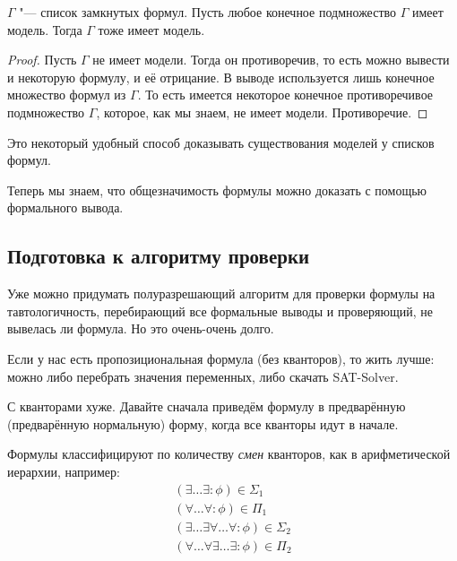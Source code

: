 \begin{theorem}
	$\Gamma$ "--- список замкнутых формул.
	Пусть любое конечное подмножество $\Gamma$ имеет модель.
	Тогда $\Gamma$ тоже имеет модель.
\end{theorem}
\begin{proof}
	Пусть $\Gamma$ не имеет модели.
	Тогда он противоречив, то есть можно вывести и некоторую формулу, и её отрицание.
	В выводе используется лишь конечное множество формул из $\Gamma$.
	То есть имеется некоторое конечное противоречивое подмножество $\Gamma$,
	которое, как мы знаем, не имеет модели.
	Противоречие.
\end{proof}
\begin{Rem}
	Это некоторый удобный способ доказывать существования моделей у списков формул.
\end{Rem}

\begin{Rem}
	Теперь мы знаем, что общезначимость формулы можно доказать с помощью формального вывода.
\end{Rem}

\subsection{Подготовка к алгоритму проверки}
Уже можно придумать полуразрешающий алгоритм для проверки формулы на тавтологичность,
перебирающий все формальные выводы и проверяющий, не вывелась ли формула.
Но это очень-очень долго.

Если у нас есть пропозициональная формула (без кванторов), то жить лучше: можно либо перебрать
значения переменных, либо скачать SAT-Solver.

С кванторами хуже.
Давайте сначала приведём формулу в предварённую (предварённую нормальную) форму, когда
все кванторы идут в начале.

Формулы классифицируют по количеству \textsl{смен} кванторов, как в арифметической иерархии, например:
\begin{gather*}
	(\exists \dots \exists \colon \phi) \in \Sigma_1 \\
	(\forall \dots \forall \colon \phi) \in \Pi_1 \\
	(\exists \dots \exists \forall \dots \forall \colon \phi) \in \Sigma_2 \\
	(\forall \dots \forall \exists \dots \exists \colon \phi) \in \Pi_2 \\
\end{gather*}

